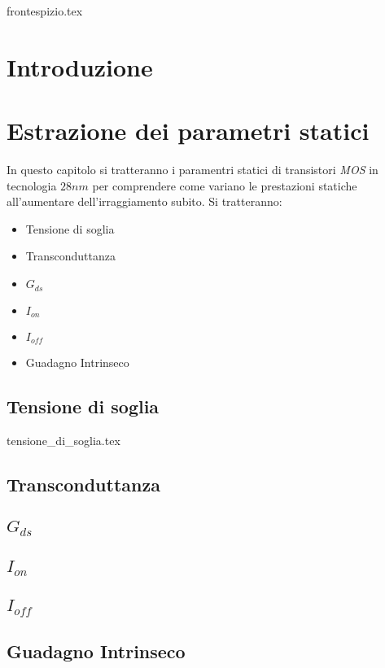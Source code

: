\documentclass[
	a4paper,
	cleardoublepage=empty,
	headings=twolinechapter,
	numbers=autoenddot,
]{scrbook}
\begin{document}
\frontmatter

{frontespizio.tex}

\tableofcontents

\chapter*{Introduzione}



\mainmatter

\chapter{Estrazione dei parametri statici}
In questo capitolo si tratteranno i paramentri statici di transistori \emph{MOS} in tecnologia $28 nm$ per comprendere come variano le prestazioni statiche all'aumentare dell'irraggiamento subito. Si tratteranno:
\begin{itemize}
  \item Tensione di soglia
  \item Transconduttanza
  \item $G_{ds}$
  \item $I_{on}$
  \item $I_{off}$
  \item Guadagno Intrinseco
\end{itemize}
\section{Tensione di soglia}
{tensione_di_soglia.tex}

\section[$G_{m}$]{Transconduttanza}

\section[$G_{ds}$]{$G_{ds}$}

\section[$I_{on}$]{$I_{on}$}
\section[$I_{off}$]{$I_{off}$}
\section[Guadagno Intrinseco]{Guadagno Intrinseco}

\backmatter



\end{document}
